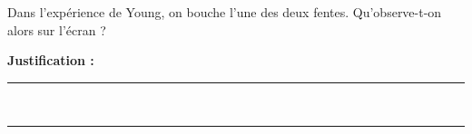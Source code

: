 Dans l'expérience de Young, on bouche l'une des deux fentes. Qu'observe-t-on alors sur l'écran ?

\choices

\noindent\textbf{Justification :} \hrulefill \\[2.5ex]
\rule{\linewidth}{0.4pt} \\[2.5ex]
\rule{\linewidth}{0.4pt}
\vfill
